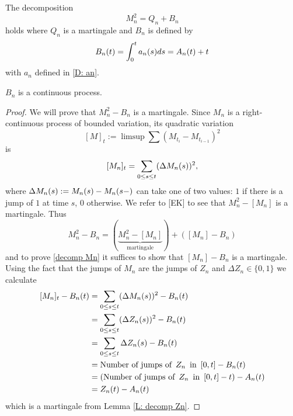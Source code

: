 \begin{lemma} \label{L: decomp Mn}
	The decomposition
	\begin{equation} \label{E: decomp Mn}
	M_n^2 = Q_n + B_n
	\end{equation}
	holds where $Q_n$ is a martingale and $B_n$ is defined by 
	\begin{equation} \label{D: An}
	B_n(t) = \int_{0}^{t} a_n(s)ds = A_n(t) + t
	\end{equation}
	with $a_n$ defined in \ref{D: an}.
\end{lemma}
\begin{note} \label{N: decomp Mn}
	$B_n$ is a continuous process.
\end{note}
\begin{proof} \label{P: decomp Mn}
	We will prove that
	$M_n^2 - B_n$
	is a martingale.
	Since $M_n$ is a right-continuous process of bounded variation, its quadratic variation
	\begin{equation*} \label{D: quadratic variation}
	[M]_t := \limsup \sum (M_{t_i} - M_{t_{i-1}})^2
	\end{equation*}
	is
	\begin{equation} \label{E: quadratic variation Mn}
	[M_n]_{t} = \sum_{0 \leq s \leq t} (\Delta M_n(s))^2,
	\end{equation}
	where
	$\Delta M_n(s) := M_n(s) - M_n(s-)$ 
	can take one of two values: $1$ if there is a jump of $1$ at time $s$, 0 otherwise.
	We refer to [EK] to see that
	$M_n^2 - [M_n]$
	is a martingale.
	Thus
	\begin{equation}
	M_n^2 - B_n = (\underbrace{M_n^2 - [M_n]}_{\text{martingale}}) + ([M_n] - B_n)
	\end{equation}
	and to prove \ref{decomp Mn} it suffices to show that
	$[M_n] - B_n$
	is a martingale.
	Using the fact that the jumps of $M_n$ are the jumps of $Z_n$ and
	$\Delta Z_n \in \lbrace0,1 \rbrace$
	we calculate
	\begin{align*}
	[M_n]_{t} - B_n(t)
	&= \sum_{0 \leq s \leq t} (\Delta M_n(s))^2 - B_n(t) \\
	&= \sum_{0 \leq s \leq t} (\Delta Z_n(s))^2 - B_n(t) \\
	&= \sum_{0 \leq s \leq t} \Delta Z_n(s) - B_n(t) \\
	&= \text{Number of jumps of} \enspace Z_n \enspace \text{in} \enspace [0,t] - B_n(t) \\
	&= (\text{Number of jumps of} \enspace Z_n \enspace \text{in} \enspace [0,t] - t) - A_n(t) \\
	&= Z_n(t) - A_n(t)
	\end{align*}
	which is a martingale from Lemma \ref{L: decomp Zn}.
	
\end{proof}

